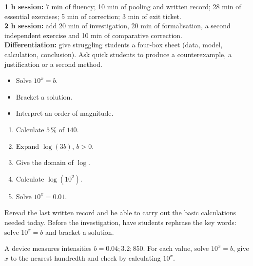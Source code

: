 \ifprof
\begin{methode}
\textbf{1 h session:} 7 min of fluency; 10 min of pooling and written record; 28 min of essential exercises; 5 min of correction; 3 min of exit ticket.\\
\textbf{2 h session:} add 20 min of investigation, 20 min of formalisation, a second independent exercise and 10 min of comparative correction.\\
\textbf{Differentiation:} give struggling students a four-box sheet (data, model, calculation, conclusion). Ask quick students to produce a counterexample, a justification or a second method.
\end{methode}
\fi
{}
\begin{objectifs}\begin{itemize}\item Solve $10^x=b$.\item Bracket a solution.\item Interpret an order of magnitude.\end{itemize}\end{objectifs}
\begin{automatismes}\begin{enumerate}\item Calculate $5\,\%$ of $140$. \item Expand $\log(3b)$, $b>0$. \item Give the domain of $\log$. \rep{$]0,+\infty[$}\item Calculate $\log(10^2)$. \item Solve $10^x=0.01$. \end{enumerate}\end{automatismes}
\begin{prerequis}Reread the last written record and be able to carry out the basic calculations needed today. Before the investigation, have students rephrase the key words: solve $10^x=b$ and bracket a solution.\end{prerequis}

\begin{activite}
A device measures intensities $b=0.04;3.2;850$. For each value, solve $10^x=b$, give $x$ to the nearest hundredth and check by calculating $10^x$.

\end{activite}

